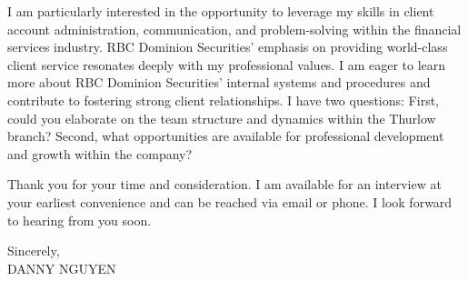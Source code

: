 \documentclass[letterpaper,11pt]{article}
\begin{document}
\vspace{10pt}

I am particularly interested in the opportunity to leverage my skills in client account administration, communication, and problem-solving within the financial services industry.  RBC Dominion Securities’ emphasis on providing world-class client service resonates deeply with my professional values. I am eager to learn more about RBC Dominion Securities’ internal systems and procedures and contribute to fostering strong client relationships. I have two questions: First, could you elaborate on the team structure and dynamics within the Thurlow branch? Second, what opportunities are available for professional development and growth within the company?

\vspace{10pt}

Thank you for your time and consideration. I am available for an interview at your earliest convenience and can be reached via email or phone. I look forward to hearing from you soon.

\vspace{20pt}

Sincerely, \\
\vspace{40pt}
DANNY NGUYEN
\end{document}
